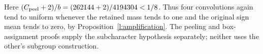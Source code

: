 Here $(C_{\rm peel}+2)/b=(262144+2)/4194304<1/8$.
Thus four convolutions again tend to uniform whenever the retained
mass tends to one and the original sign mean tends to zero, by
Proposition~\ref{l:amplification}.  The peeling and box-assignment
proofs supply the subcharacter hypothesis separately; neither uses
the other's subgroup construction.
